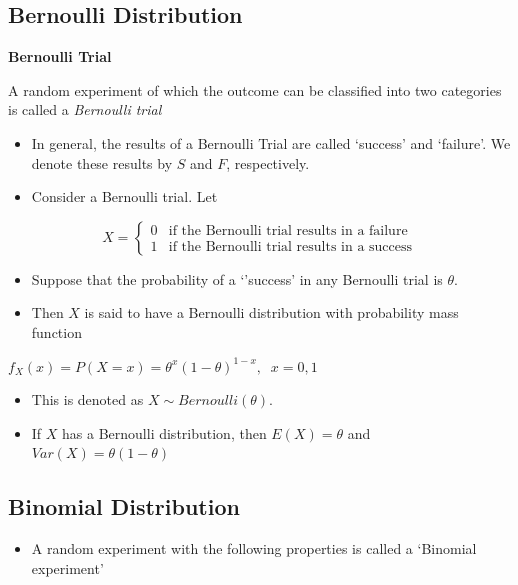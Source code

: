 \documentclass[]{book}
\providecommand{\tightlist}{%
  \setlength{\itemsep}{0pt}\setlength{\parskip}{0pt}}
\begin{document}
\hypertarget{bernoulli-distribution}{%
\subsection{Bernoulli Distribution}\label{bernoulli-distribution}}

\textbf{Bernoulli Trial}

A random experiment of which the outcome can be classified into two categories is called a \emph{Bernoulli trial}

\begin{itemize}
\item
  In general, the results of a Bernoulli Trial are called `success' and `failure'. We denote these results by \(S\) and \(F\), respectively.
\item
  Consider a Bernoulli trial. Let
\end{itemize}

\begin{equation}
X=
\begin{cases} 
0 & \text{if the Bernoulli trial results in a failure } \\
1 & \text{if the Bernoulli trial results in a success} 
\end{cases}
\end{equation}

\begin{itemize}
\item
  Suppose that the probability of a `'success' in any Bernoulli trial is \(\theta.\)
\item
  Then \(X\) is said to have a Bernoulli distribution with probability mass function
\end{itemize}

\(f_X(x)= P(X=x)=\theta^x(1-\theta)^{1-x}, \;\;x=0,1\)

\begin{itemize}
\item
  This is denoted as \(X \sim Bernoulli(\theta).\)
\item
  If \(X\) has a Bernoulli distribution, then \(E(X) = \theta\) and \(Var(X) = \theta(1-\theta)\)
\end{itemize}

\hypertarget{binomial-distribution}{%
\subsection{Binomial Distribution}\label{binomial-distribution}}

\begin{itemize}
\tightlist
\item
  A random experiment with the following properties is called a `Binomial experiment'
\end{itemize}
\end{document}
